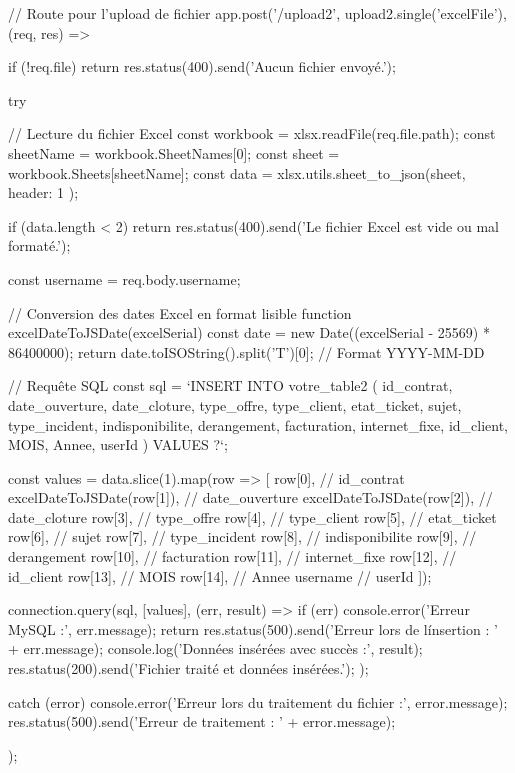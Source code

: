 // Route pour l'upload de fichier
app.post('/upload2', upload2.single('excelFile'), (req, res) => {
    if (!req.file) {
        return res.status(400).send('Aucun fichier envoyé.');
    }

    try {
        // Lecture du fichier Excel
        const workbook = xlsx.readFile(req.file.path);
        const sheetName = workbook.SheetNames[0];
        const sheet = workbook.Sheets[sheetName];
        const data = xlsx.utils.sheet_to_json(sheet, { header: 1 });

        if (data.length < 2) {
            return res.status(400).send('Le fichier Excel est vide ou mal formaté.');
        }

        const username = req.body.username;

        // Conversion des dates Excel en format lisible
        function excelDateToJSDate(excelSerial) {
            const date = new Date((excelSerial - 25569) * 86400000);
            return date.toISOString().split('T')[0]; // Format YYYY-MM-DD
        }

        // Requête SQL
        const sql = `INSERT INTO votre_table2 (
            id_contrat, date_ouverture, date_cloture, type_offre, type_client, etat_ticket, 
            sujet, type_incident, indisponibilite, derangement, facturation, 
            internet_fixe, id_client, MOIS, Annee, userId	
        ) VALUES ?`;

        const values = data.slice(1).map(row => [
            row[0],  // id_contrat
            excelDateToJSDate(row[1]),  // date_ouverture
            excelDateToJSDate(row[2]),  // date_cloture
            row[3],  // type_offre
            row[4],  // type_client
            row[5],  // etat_ticket
            row[6],  // sujet
            row[7],  // type_incident
            row[8],  // indisponibilite
            row[9],  // derangement
            row[10], // facturation
            row[11], // internet_fixe
            row[12], // id_client
            row[13], // MOIS
            row[14], // Annee
            username  // userId
        ]);

        connection.query(sql, [values], (err, result) => {
            if (err) {
                console.error('Erreur MySQL :', err.message);
                return res.status(500).send('Erreur lors de l\'insertion : ' + err.message);
            }
            console.log('Données insérées avec succès :', result);
            res.status(200).send('Fichier traité et données insérées.');
        });

    } catch (error) {
        console.error('Erreur lors du traitement du fichier :', error.message);
        res.status(500).send('Erreur de traitement : ' + error.message);
    }
});



















